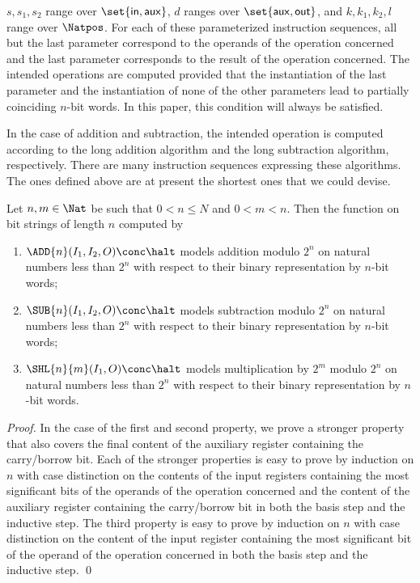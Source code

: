 \documentclass{llncs}
\begin{document}
$s,s_1,s_2$ range over $\set{\mathsf{in},\mathsf{aux}}$, 
$d$ ranges over $\set{\mathsf{aux},\mathsf{out}}$, and
$k,k_1,k_2,l$ range over $\Natpos$.
For each of these parameterized instruction sequences, all but the last 
parameter correspond to the operands of the operation concerned and the 
last parameter corresponds to the result of the operation concerned.
The intended operations are computed provided that the instantiation of 
the last parameter and the instantiation of none of the other parameters 
lead to partially coinciding $n$-bit words.
In this paper, this condition will always be satisfied.

In the case of addition and subtraction, the intended operation is 
computed according to the long addition algorithm and the long 
subtraction algorithm, respectively.
There are many instruction sequences expressing these algorithms.
The ones defined above are at present the shortest ones that we could 
devise.

\begin{proposition}
\label{prop-basic-operations-correct}
Let $n,m \in \Nat$ be such that $0 < n \leq N$ and $0 < m < n$.
Then the function on bit strings of length $n$ computed by 
\begin{enumerate}
\item
$\ADD{n}(I_1,I_2,O) \conc \halt$ models addition modulo $2^n$ on 
natural numbers less than $2^n$ with respect to their binary 
representation by $n$-bit words;
\item
$\SUB{n}(I_1,I_2,O) \conc \halt$ models subtraction modulo $2^n$ on 
natural numbers less than $2^n$ with respect to their binary 
representation by $n$-bit words;
\item
$\SHL{n}{m}(I_1,O) \conc \halt$ models multiplication by $2^m$ modulo 
$2^n$ on natural numbers less than $2^n$ with respect to their binary 
representation by $n$-bit words.
\end{enumerate}
\end{proposition}
\begin{proof}
In the case of the first and second property, we prove a stronger 
property that also covers the final content of the auxiliary register 
containing the carry/borrow bit.
Each of the stronger properties is easy to prove by induction on $n$ 
with case distinction on the contents of the input registers containing 
the most significant bits of the operands of the operation concerned and 
the content of the auxiliary register containing the carry/borrow bit in 
both the basis step and the inductive step.
The third property is easy to prove by induction on $n$ with case 
distinction on the content of the input register containing the most 
significant bit of the operand of the operation concerned in both the 
basis step and the inductive step.
\qed
\end{proof}
\end{document}
